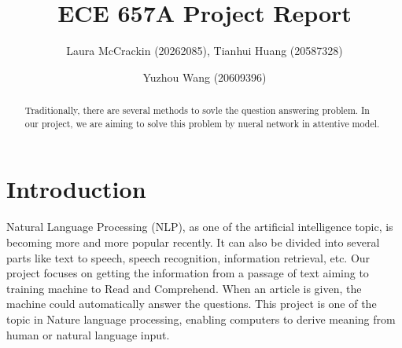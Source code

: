 \documentclass[runningheads,a4paper]{llncs}
\newcommand{\commentontext}[2]{\colorbox{yellow!60}{#1}\pdfcomment[color={0.234 0.867 0.211},hoffset=-6pt,voffset=10pt,opacity=0.5]{#2}}
\newcommand{\commentatside}[1]{\pdfcomment[color={0.045 0.278 0.643},icon=Note]{#1}}
\newcommand{\todo}[1]{\commentatside{#1}}
\begin{document}


\title{ECE 657A Project Report}

\author{Laura McCrackin (20262085),  Tianhui Huang (20587328) \and Yuzhou Wang (20609396)}

%
\iffalse

\institute{
University of Waterloo\\
\email{...}\and
University of Waterloo\\
\email{...}
}
\fi
			
\maketitle
\begin{abstract}
Traditionally, there are several methods to sovle the question answering problem. In our project, we are aiming to solve this problem by nueral network in attentive model.
\end{abstract}



\section{Introduction}\label{sec:intro}



Natural Language Processing (NLP), as one of the artificial intelligence topic, is becoming more and more popular recently. It can also be divided into several parts like text to speech, speech recognition, information retrieval, etc. Our project focuses on getting the information from a passage of text aiming to training machine to Read and Comprehend. When an article is given, the machine could automatically answer the questions. This project is one of the topic in Nature language processing, enabling computers to derive meaning from human or natural language input.  
\end{document}
